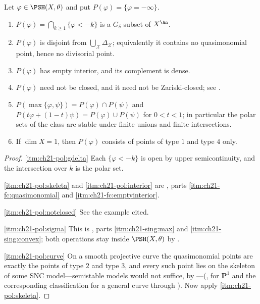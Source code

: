 \begin{proposition}
\label{prop:ch21-polar-structure}
Let $\varphi\in\PSH(X,\theta)$ and put $P(\varphi)=\{\varphi=-\infty\}$.
\begin{enumerate}
\item\label{itm:ch21-pol:gdelta}
$P(\varphi)=\bigcap_{k\geq1}\{\varphi<-k\}$ is a $G_\delta$ subset of
$X^{\An}$.
\item\label{itm:ch21-pol:skeleta}
$P(\varphi)$ is disjoint from $\bigcup_{\mathcal X}\Delta_{\mathcal X}$;
equivalently it contains no quasimonomial point, hence no divisorial point.
\item\label{itm:ch21-pol:interior}
$P(\varphi)$ has empty interior, and its complement is dense.
\item\label{itm:ch21-pol:notclosed}
$P(\varphi)$ need not be closed, and it need not be Zariski-closed; see
.
\item\label{itm:ch21-pol:sigma}
$P(\max\{\varphi,\psi\})=P(\varphi)\cap P(\psi)$ and
$P(t\varphi+(1-t)\psi)=P(\varphi)\cup P(\psi)$ for $0<t<1$; in
particular the polar sets of the class are stable under finite unions and
finite intersections.
\item\label{itm:ch21-pol:curve}
If $\dim X=1$, then $P(\varphi)$ consists of points of type $1$ and
type $4$ only.
\end{enumerate}
\end{proposition}

\begin{proof}
\cref{itm:ch21-pol:gdelta}  Each $\{\varphi<-k\}$ is open by upper
semicontinuity, and the intersection over $k$ is the polar set.

\cref{itm:ch21-pol:skeleta} and \cref{itm:ch21-pol:interior} are
,
parts \cref{itm:ch21-fc:quasimonomial} and
\cref{itm:ch21-fc:emptyinterior}.

\cref{itm:ch21-pol:notclosed}  See the example cited.

\cref{itm:ch21-pol:sigma}  This is
,
parts \cref{itm:ch21-sing:max} and \cref{itm:ch21-sing:convex}; both
operations stay inside $\PSH(X,\theta)$ by
.

\cref{itm:ch21-pol:curve}  On a smooth projective curve the quasimonomial
points are exactly the points of type $2$ and type $3$, and every such
point lies on the skeleton of some SNC model---semistable models would not
suffice, by ---(,
 for $\mathbf P^1$ and the
corresponding classification for a general curve through
).  Now apply
\cref{itm:ch21-pol:skeleta}.
\end{proof}

